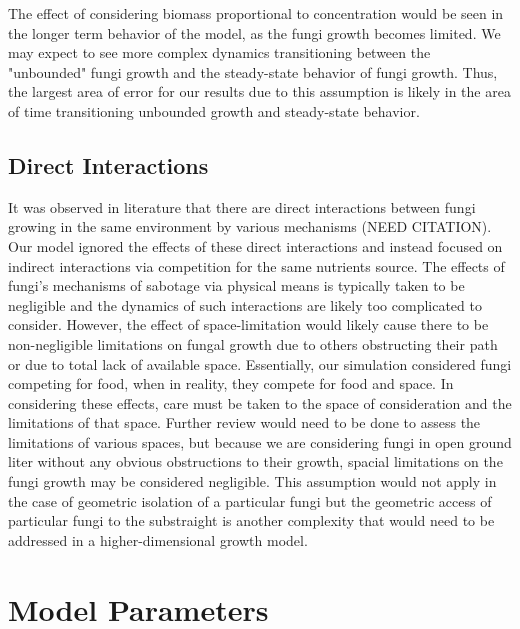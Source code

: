 \documentclass[12pt]{article}
\newenvironment{ColumnFigure}
{\par\medskip\noindent\minipage{\linewidth}}
{\endminipage\par\medskip}
\begin{document}
\begin{multicols}{2}
The effect of considering biomass proportional to concentration would be seen in the longer term behavior of the model, as the fungi growth becomes limited. We may expect to see more complex dynamics transitioning between the "unbounded" fungi growth and the steady-state behavior of fungi growth. Thus, the largest area of error for our results due to this assumption is likely in the area of time transitioning unbounded growth and steady-state behavior.

\subsection{Direct Interactions}

It was observed in literature that there are direct interactions between fungi growing in the same environment by various mechanisms (NEED CITATION). Our model ignored the effects of these direct interactions and instead focused on indirect interactions via competition for the same nutrients source. The effects of fungi's mechanisms of sabotage via physical means is typically taken to be negligible and the dynamics of such interactions are likely too complicated to consider. However, the effect of space-limitation would likely cause there to be non-negligible limitations on fungal growth due to others obstructing their path or due to total lack of available space. Essentially, our simulation considered fungi competing for food, when in reality, they compete for food and space. In considering these effects, care must be taken to the space of consideration and the limitations of that space. Further review would need to be done to assess the limitations of various spaces, but because we are considering fungi in open ground liter without any obvious obstructions to their growth, spacial limitations on the fungi growth may be considered negligible. This assumption would not apply in the case of geometric isolation of a particular fungi but the geometric access of particular fungi to the substraight is another complexity that would need to be addressed in a higher-dimensional growth model. 


\end{multicols}
\newpage
\appendix
\section{Model Parameters}
\end{document}
